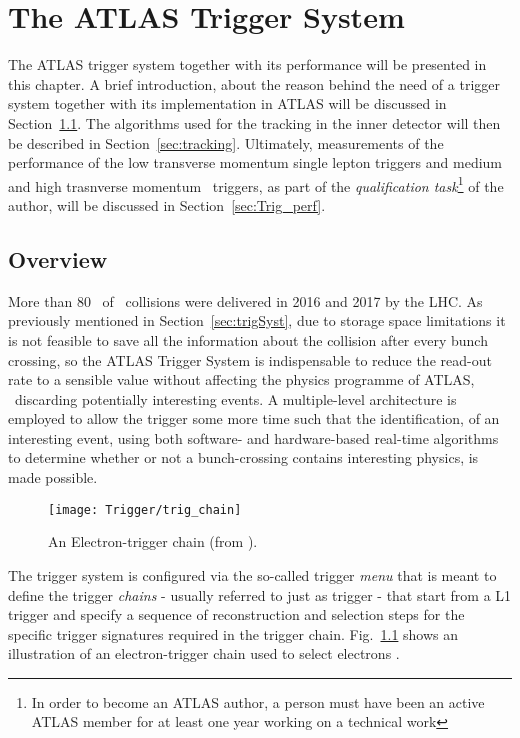 \chapter{The ATLAS Trigger System}
\label{ch:trigger}

	The ATLAS trigger system together with its performance will be presented in this chapter. A brief introduction, about the reason behind the need of a trigger system together with its implementation in ATLAS will be discussed in Section~\ref{sec:Trig_intro}. The algorithms used for the tracking in the inner detector will then be described in Section~\ref{sec:tracking}. Ultimately, measurements of the performance of the low transverse momentum single lepton triggers and medium and high trasnverse momentum \bj\ triggers, as part of the \textit{qualification task}\footnote{In order to become an ATLAS author, a person must have been an active ATLAS member for at least one year working on a technical work} of the author, will be discussed in Section~\ref{sec:Trig_perf}. 



	\section{Overview}
	\label{sec:Trig_intro}

		More than 80 \ifb\ of \pp\ collisions were delivered in 2016 and 2017 by the LHC. As previously mentioned in Section~\ref{sec:trigSyst}, due to storage space limitations it is not feasible to save all the information about the collision after every bunch crossing, so the ATLAS Trigger System is indispensable to reduce the read-out rate to a sensible value without affecting the physics programme of ATLAS, \eg\ discarding potentially interesting events. A multiple-level architecture is employed to allow the trigger some more time such that the identification, of an interesting event, using both software- and hardware-based real-time algorithms to determine whether or not a bunch-crossing contains interesting physics, is made possible. 

		\begin{figure}[!htb]
			\centering
			\texttt{[image: Trigger/trig\_chain]}
			\caption{\label{fig:trig_chain} An Electron-trigger chain (from \cite{ATLASTrigger2010}).}
		\end{figure}

		The trigger system is configured via the so-called trigger \textit{menu} that is meant to define the trigger \textit{chains} - usually referred to just as trigger - that start from a L1 trigger and specify a sequence of reconstruction and selection steps for the specific trigger signatures required in the trigger chain. Fig.~\ref{fig:trig_chain} shows an illustration of an electron-trigger chain used to select electrons \cite{ATLASTrigger2010}.

